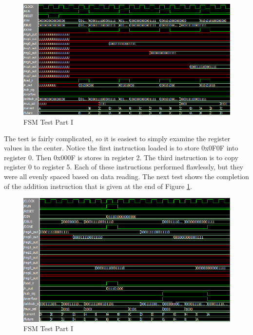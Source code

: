 \documentclass[11pt]{report}
\begin{document}
\begin{spacing}{1.5}
\vspace{15px}
\begin{figure}[H]
    \centering
    \includegraphics[width=1.0\textwidth,keepaspectratio]{lab5atest.png}
    \caption{FSM Test Part I}
    \label{fig:fsm}
\end{figure}

The test is fairly complicated, so it is easiest to simply examine the register values in the center.  Notice the first instruction loaded is to store 0x0F0F into register 0.  Then 0x000F is stores in register 2.  The third instruction is to copy register 0 to register 5.  Each of these instructions performed flawlessly, but they were all evenly spaced based on data reading.  The next test shows the completion of the addition instruction that is given at the end of Figure \ref{fig:fsm}.

\vspace{15px}
\begin{figure}[H]
    \centering
    \includegraphics[width=1.0\textwidth,keepaspectratio]{lab5atest_2.png}
    \caption{FSM Test Part I}
    \label{fig:fsm2}
\end{figure}


\end{spacing}
\end{document}
